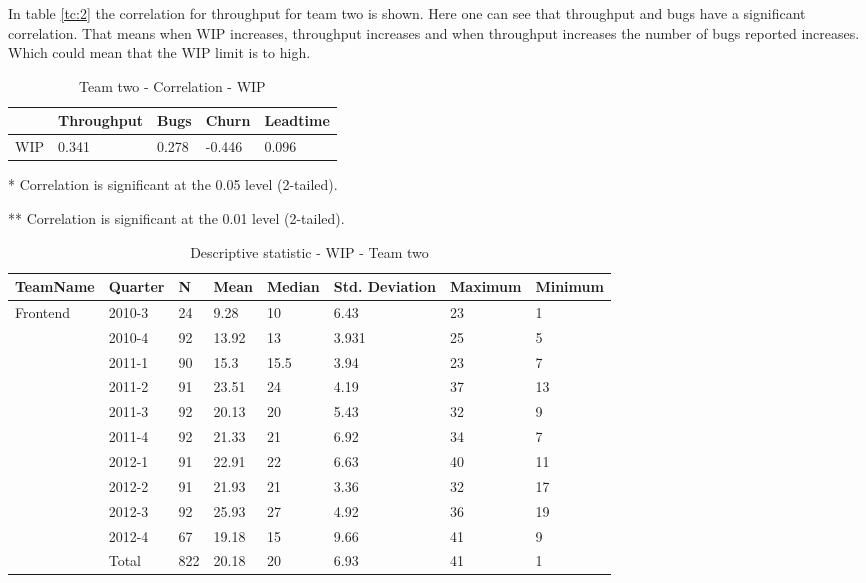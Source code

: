 \documentclass[UKenglish]{ifimaster}  %
\begin{document}
In table \ref{tc:2} the correlation for throughput for team two is shown.  Here one can see that throughput and bugs have a significant correlation. That means when WIP increases, throughput increases and when throughput increases the number of bugs reported increases. Which could mean that the WIP limit is to high.


\begin{table}[!htbp] 
 \centering 
\begin{tabular}{|l|l|l|l|l|} \hline
&Throughput & Bugs & Churn  & Leadtime  \\ 
\hline
	WIP &    0.341 & 0.278  & -0.446 & 0.096 \\ \hline
 \end{tabular}
  \caption{Team two - Correlation - WIP} 
  \label{wc:2}
  \centerline {* Correlation is significant at the 0.05 level (2-tailed).}
      \centerline{  ** Correlation is significant at the 0.01 level (2-tailed).}
 \end{table} 
 
 
  \begin{table}[!htbp]
  \begin{tabular}{ | l | l | l | l | l | l | l | l | }
\hline
TeamName & Quarter & N & Mean & Median & Std. Deviation & Maximum & Minimum \\ \hline
Frontend & 2010-3 & 24 & 9.28 & 10 & 6.43 & 23 & 1 \\ \hline
	 & 2010-4 & 92 & 13.92 & 13 & 3.931 & 25 & 5 \\ \hline
	 & 2011-1 & 90 & 15.3 & 15.5 & 3.94 & 23 & 7 \\ \hline
	 & 2011-2 & 91 & 23.51 & 24 & 4.19 & 37 & 13 \\ \hline
	 & 2011-3 & 92 & 20.13 & 20 & 5.43 & 32 & 9 \\ \hline
	 & 2011-4 & 92 & 21.33 & 21 & 6.92 & 34 & 7 \\ \hline
	 & 2012-1 & 91 & 22.91 & 22 & 6.63 & 40 & 11 \\ \hline
	 & 2012-2 & 91 & 21.93 & 21 & 3.36 & 32 & 17 \\ \hline
	 & 2012-3 & 92 & 25.93 & 27 & 4.92 & 36 & 19 \\ \hline
	 & 2012-4 & 67 & 19.18 & 15 & 9.66 & 41 & 9 \\ \hline
	 & Total & 822 & 20.18 & 20 & 6.93 & 41 & 1 \\ \hline
	 \end{tabular}
  	  \caption{Descriptive statistic - WIP - Team two }%
	  \label{dsw:2}
\end{table}	
\end{document}
